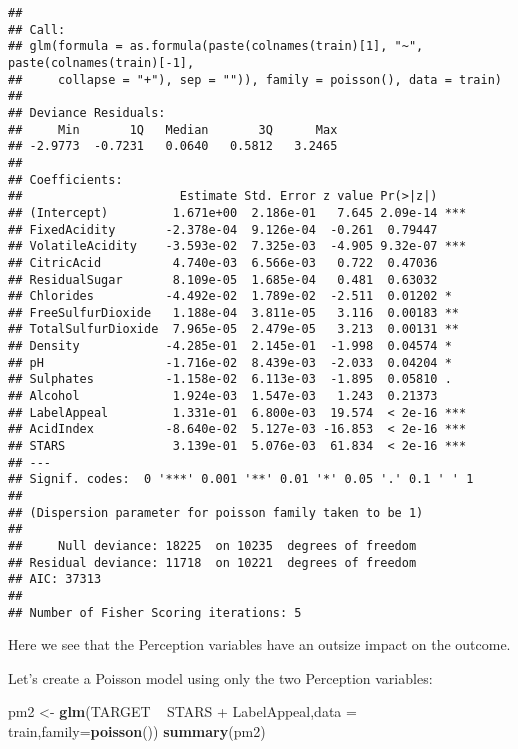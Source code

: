 \documentclass[]{article}
\newenvironment{Shaded}{\begin{snugshade}}{\end{snugshade}}
\newcommand{\KeywordTok}[1]{\textcolor[rgb]{0.13,0.29,0.53}{\textbf{{#1}}}}
\newcommand{\DataTypeTok}[1]{\textcolor[rgb]{0.13,0.29,0.53}{{#1}}}
\newcommand{\StringTok}[1]{\textcolor[rgb]{0.31,0.60,0.02}{{#1}}}
\newcommand{\NormalTok}[1]{{#1}}
\begin{document}
\begin{verbatim}
## 
## Call:
## glm(formula = as.formula(paste(colnames(train)[1], "~", paste(colnames(train)[-1], 
##     collapse = "+"), sep = "")), family = poisson(), data = train)
## 
## Deviance Residuals: 
##     Min       1Q   Median       3Q      Max  
## -2.9773  -0.7231   0.0640   0.5812   3.2465  
## 
## Coefficients:
##                      Estimate Std. Error z value Pr(>|z|)    
## (Intercept)         1.671e+00  2.186e-01   7.645 2.09e-14 ***
## FixedAcidity       -2.378e-04  9.126e-04  -0.261  0.79447    
## VolatileAcidity    -3.593e-02  7.325e-03  -4.905 9.32e-07 ***
## CitricAcid          4.740e-03  6.566e-03   0.722  0.47036    
## ResidualSugar       8.109e-05  1.685e-04   0.481  0.63032    
## Chlorides          -4.492e-02  1.789e-02  -2.511  0.01202 *  
## FreeSulfurDioxide   1.188e-04  3.811e-05   3.116  0.00183 ** 
## TotalSulfurDioxide  7.965e-05  2.479e-05   3.213  0.00131 ** 
## Density            -4.285e-01  2.145e-01  -1.998  0.04574 *  
## pH                 -1.716e-02  8.439e-03  -2.033  0.04204 *  
## Sulphates          -1.158e-02  6.113e-03  -1.895  0.05810 .  
## Alcohol             1.924e-03  1.547e-03   1.243  0.21373    
## LabelAppeal         1.331e-01  6.800e-03  19.574  < 2e-16 ***
## AcidIndex          -8.640e-02  5.127e-03 -16.853  < 2e-16 ***
## STARS               3.139e-01  5.076e-03  61.834  < 2e-16 ***
## ---
## Signif. codes:  0 '***' 0.001 '**' 0.01 '*' 0.05 '.' 0.1 ' ' 1
## 
## (Dispersion parameter for poisson family taken to be 1)
## 
##     Null deviance: 18225  on 10235  degrees of freedom
## Residual deviance: 11718  on 10221  degrees of freedom
## AIC: 37313
## 
## Number of Fisher Scoring iterations: 5
\end{verbatim}

Here we see that the Perception variables have an outsize impact on the
outcome.

Let's create a Poisson model using only the two Perception variables:

\begin{Shaded}
\begin{Highlighting}[]
\NormalTok{pm2 <-}\StringTok{ }\KeywordTok{glm}\NormalTok{(TARGET ~}\StringTok{ }\NormalTok{STARS +}\StringTok{ }\NormalTok{LabelAppeal,}\DataTypeTok{data =} \NormalTok{train,}\DataTypeTok{family=}\KeywordTok{poisson}\NormalTok{()) }
\KeywordTok{summary}\NormalTok{(pm2)}
\end{Highlighting}
\end{Shaded}
\end{document}
